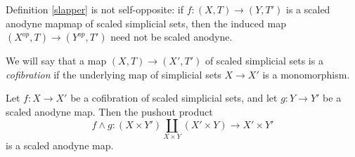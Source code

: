 \begin{remark}
Definition \ref{slapper} is not self-opposite: if $f: (X,T) \rightarrow (Y,T')$ is a scaled anodyne mapmap of scaled simplicial sets, then the induced map $(X^{op}, T) \rightarrow (Y^{op}, T')$ need not be scaled anodyne. 
\end{remark}

 \begin{definition}
We will say that a map $(X,T) \rightarrow (X',T')$ of scaled simplicial sets is
a {\it cofibration} if the underlying map of simplicial sets $X \rightarrow X'$ is a monomorphism.
\end{definition}

\begin{proposition}\label{notred}
Let $f: X \rightarrow X'$ be a cofibration of scaled simplicial sets, and let
$g: Y \rightarrow Y'$ be a scaled anodyne map. Then the pushout product
$$ f \wedge g: (X \times Y') \coprod_{ X \times Y} (X' \times Y) \rightarrow X' \times Y'$$
is a scaled anodyne map.
\end{proposition}

